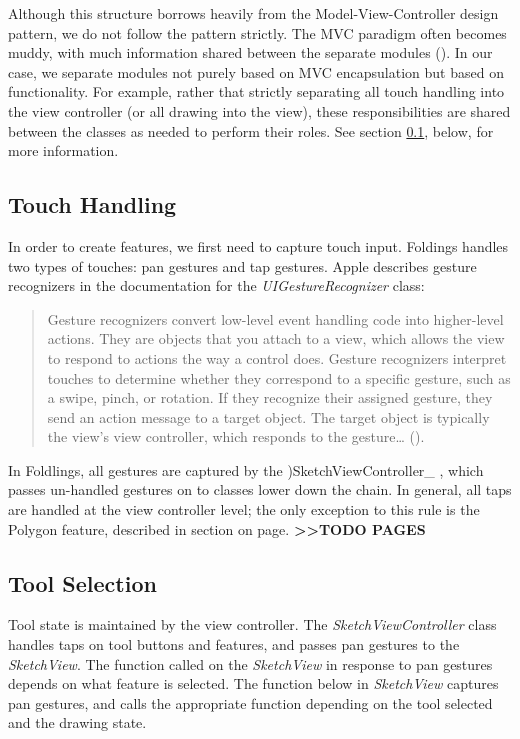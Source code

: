 Although this structure borrows heavily from the Model-View-Controller
design pattern, we do not follow the pattern strictly. The MVC paradigm
often becomes muddy, with much information shared between the separate
modules (\citet{veit2003model}). In our case, we separate modules not
purely based on MVC encapsulation but based on functionality. For
example, rather that strictly separating all touch handling into the
view controller (or all drawing into the view), these responsibilities
are shared between the classes as needed to perform their roles. See
section \ref{touch-handling}, below, for more information.

\subsection{Touch Handling}\label{touch-handling}

In order to create features, we first need to capture touch input.
Foldings handles two types of touches: pan gestures and tap gestures.
Apple describes gesture recognizers in the documentation for the
\emph{UIGestureRecognizer} class:

\begin{quote}
Gesture recognizers convert low-level event handling code into
higher-level actions. They are objects that you attach to a view, which
allows the view to respond to actions the way a control does. Gesture
recognizers interpret touches to determine whether they correspond to a
specific gesture, such as a swipe, pinch, or rotation. If they recognize
their assigned gesture, they send an action message to a target object.
The target object is typically the view's view controller, which
responds to the gesture\ldots{} (\citet{appledocs}).
\end{quote}

In Foldlings, all gestures are captured by the )SketchViewController\_ ,
which passes un-handled gestures on to classes lower down the chain. In
general, all taps are handled at the view controller level; the only
exception to this rule is the Polygon feature, described in section on
page. \textbf{\textgreater{}\textgreater{}TODO PAGES}

\subsection{Tool Selection}\label{tool-selection}

Tool state is maintained by the view controller. The
\emph{SketchViewController} class handles taps on tool buttons and
features, and passes pan gestures to the \emph{SketchView}. The function
called on the \emph{SketchView} in response to pan gestures depends on
what feature is selected. The function below in \emph{SketchView}
captures pan gestures, and calls the appropriate function depending on
the tool selected and the drawing state.


